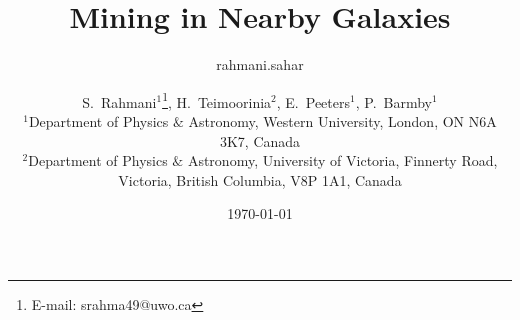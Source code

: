 \documentclass[useAMS,usenatbib]{mn2e}
\begin{document}

\title{Mining in Nearby Galaxies}
\author{rahmani.sahar }
\date{\today}
\author[S. Rahmani, et. al.]{S.~Rahmani$^{1}$\thanks{E-mail:
srahma49@uwo.ca}, H.~Teimoorinia$^{2}$, E.~Peeters$^{1}$, P.~Barmby$^{1}$\\
$^{1}$Department of Physics $\&$ Astronomy, Western University, London, ON N6A 3K7, Canada\\
$^{2}$Department of Physics $\&$ Astronomy, University of Victoria, Finnerty Road, Victoria, British Columbia, V8P 1A1, Canada}
\maketitle

\end{document}
